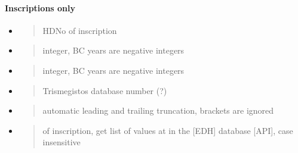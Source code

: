 \documentclass[a4paper,12pt,english]{sphinxhowto}
\begin{document}
\paragraph{Inscriptions only}
\label{\detokenize{Epigraphic:inscriptions-only}}\begin{itemize}
\item {} 
\begin{quote}

HD\sphinxhyphen{}No of inscription
\end{quote}

\item {} 
\begin{quote}

integer, BC years are negative integers
\end{quote}

\item {} 
\begin{quote}

integer, BC years are negative integers
\end{quote}

\item {} 
\begin{quote}

Trismegistos database number (?)
\end{quote}

\item {} 
\begin{quote}

automatic leading and trailing truncation, brackets are ignored
\end{quote}

\item {} 
\begin{quote}

of inscription, get list of values at 
in the {[}EDH{]} database {[}API{]}, case insensitive
\end{quote}

\end{itemize}

\end{document}
